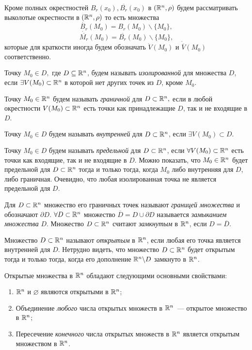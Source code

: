 \documentclass[../../main.tex]{subfiles}
\begin{document}
  \begin{rem}
    Кроме полных окрестностей $B_r(x_0), \overline{B_r}(x_0)$ в $
    (\mathbb{R}^n, \rho)$ будем рассматривать выколотые окрестности в $
    (\mathbb{R}^n, \rho)$ то есть множества
    \[
      \dot{B_r}(M_0) = B_r(M_0) \backslash \{M_0\},
    \]
    \[
      \dot{\overline{M_r}}(M_0) = \overline{B_r}(M_0) \backslash \{M_0\},
    \]
    которые для краткости иногда будем обозначать $\dot{V}(M_0) $ и 
    $\dot{\overline{V}}(M_0)$ соответственно. 
  \end{rem}
  \smallskip
  
  Точку $M_0 \in D,$ где $D \subseteq \mathbb{R}^n$, будем называть 
  \emph{изолированной} для множества $D$, если $\exists V(M_0) \subset 
  \mathbb{R}^n$ в которой нет других точек из $D$, кроме $M_0$.
  
  Точку $M_0 \in \mathbb{R}^n$ будем называть \emph{граничной} для $D \subset \mathbb{R}^n,
  $ если в любой окрестности $V(M_0) \subset \mathbb{R}^n$ есть точки как 
  принадлежащие $D$, так и не входящие в $D$.
  
  Точку $M_0 \in D$ будем называть \emph{внутренней} для $D \subset \mathbb{R}^n$, 
  если $\exists V(M_0) \subset D$.
  
  Точку $M_0 \in D$ будем называть \emph{предельной} для $D \subset \mathbb{R}^n$, 
  если $\forall V(M_0) \subset \mathbb{R}^n$ есть точки как входящие, так и 
  не входящие в $D$.
  Можно показать, что $M_0 \in \mathbb{R}^n$ будет предельной для $D \subset 
  \mathbb{R}^n$ тогда и только тогда, когда $M_0$ либо внутренняя для $D$, 
  либо граничная.
  Очевидно, что любая изолированная точка не является предельной для 
  $D$.
  
  Для $D \subset \mathbb{R}^n$ множество его граничных точек называют 
  \emph{границей множества} и обозначают $\partial D$. 
  $\forall D \subset \mathbb{R}^n$ множество $\overline D = D \cup \partial D$ 
  называется \emph{замыканием множества} $D$. 
  Множество $D \subset \mathbb{R}^n$ считают \emph{замкнутым} в $\mathbb{R}^n$, если  $D = \overline 
  D$.
  
  Множество $D \subset \mathbb{R}^n$ называют \emph{открытым} в $\mathbb{R}^n$, если любая 
  его точка является внутренней для $D$. Нетрудно видеть, что 
  множество $D \subset \mathbb{R}^n$ будет открытым тогда и только тогда, 
  когда его дополнение $\mathbb{R}^n \backslash D$ замкнуто в $\mathbb{R}^n$. 
  
  \smallskip
  Открытые множества в $\mathbb{R}^n$ обладают следующими основными 
  свойствами:
  \begin{enumerate}
    \item
     $\mathbb{R}^n$  и $\varnothing$ являются открытыми в $\mathbb{R}^n$; 
     \item
      Объединение \emph{любого} числа открытых множеств в $\mathbb{R}^n$~--- 
      открытое множество в $\mathbb{R}^n$; 
      \item Пересечение \emph{конечного} числа открытых множеств в 
      $\mathbb{R}^n$ является открытым множеством в $\mathbb{R}^n$.
  \end{enumerate}  
\end{document}
